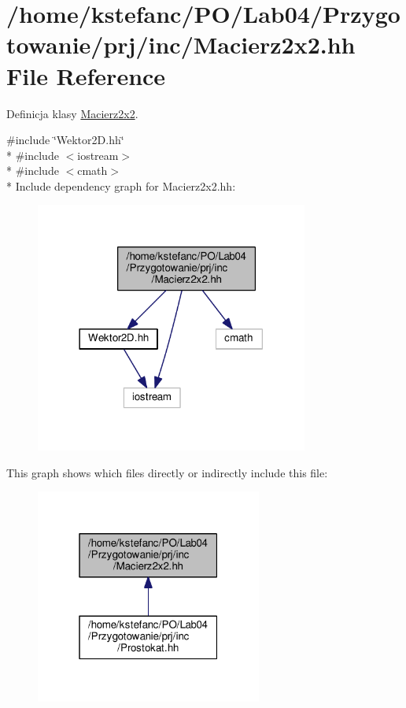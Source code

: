 \hypertarget{_macierz2x2_8hh}{\section{/home/kstefanc/\+P\+O/\+Lab04/\+Przygotowanie/prj/inc/\+Macierz2x2.hh File Reference}
\label{_macierz2x2_8hh}
}


Definicja klasy \hyperlink{class_macierz2x2}{Macierz2x2}.  


{\ttfamily \#include \char`\"{}Wektor2\+D.\+hh\char`\"{}}\\*
{\ttfamily \#include $<$iostream$>$}\\*
{\ttfamily \#include $<$cmath$>$}\\*
Include dependency graph for Macierz2x2.\+hh\+:
\nopagebreak
\begin{figure}[H]
\begin{center}
\leavevmode
\includegraphics[width=254pt]{_macierz2x2_8hh__incl}
\end{center}
\end{figure}
This graph shows which files directly or indirectly include this file\+:
\nopagebreak
\begin{figure}[H]
\begin{center}
\leavevmode
\includegraphics[width=211pt]{_macierz2x2_8hh__dep__incl}
\end{center}
\end{figure}
